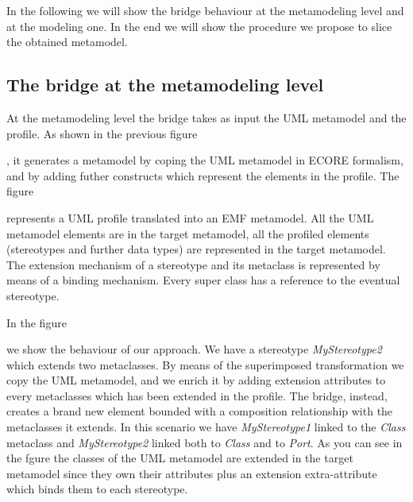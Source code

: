 
In the following we will show the bridge behaviour at the metamodeling level and at the modeling one. In the end we will show the procedure we propose to slice the obtained metamodel.

\subsection{The bridge at the metamodeling level}\label{sec:metamodelLevel}

At the metamodeling level the bridge takes as input the UML metamodel and the profile. As shown in the previous figure 


, it generates a metamodel by coping the UML metamodel in ECORE formalism, and by adding futher constructs which represent the elements in the profile. The figure 


represents a UML profile translated into an EMF metamodel. All the UML metamodel elements are in the target metamodel, all the profiled elements (stereotypes and further data types) are represented in the target metamodel. The extension mechanism of a stereotype and its metaclass is represented by means of a binding mechanism. Every super class has a reference to the eventual stereotype.


In the figure 


we show the behaviour of our approach. We have a stereotype \emph{MyStereotype2} which extends two metaclasses. By means of the superimposed  transformation we copy the UML metamodel, and we enrich it by adding extension attributes to every metaclasses which has been extended in the profile. The bridge, instead, creates a brand new element bounded with a composition relationship with the metaclasses it extends. In this scenario we have \emph{MyStereotype1} linked to the \emph{Class} metaclass and \emph{MyStereotype2} linked both to \emph{Class} and to \emph{Port}. As you can see in the fgure the classes of the UML metamodel are extended in the target metamodel since they own their attributes plus an extension extra-attribute which binds them to each stereotype.

